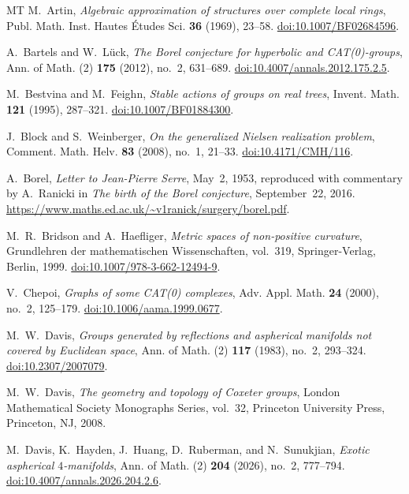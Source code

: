 \begin{thebibliography}{MT}
M.~Artin,
\emph{Algebraic approximation of structures over complete local rings},
Publ. Math. Inst. Hautes \'Etudes Sci. \textbf{36} (1969), 23--58.
\href{https://doi.org/10.1007/BF02684596}{doi:10.1007/BF02684596}.

A.~Bartels and W.~L\"uck,
\emph{The Borel conjecture for hyperbolic and CAT(0)-groups},
Ann. of Math. (2) \textbf{175} (2012), no.~2, 631--689.
\href{https://doi.org/10.4007/annals.2012.175.2.5}{doi:10.4007/annals.2012.175.2.5}.

M.~Bestvina and M.~Feighn,
\emph{Stable actions of groups on real trees},
Invent. Math. \textbf{121} (1995), 287--321.
\href{https://doi.org/10.1007/BF01884300}{doi:10.1007/BF01884300}.

J.~Block and S.~Weinberger,
\emph{On the generalized Nielsen realization problem},
Comment. Math. Helv. \textbf{83} (2008), no.~1, 21--33.
\href{https://doi.org/10.4171/CMH/116}{doi:10.4171/CMH/116}.

A.~Borel,
\emph{Letter to Jean-Pierre Serre}, May~2, 1953,
reproduced with commentary by A.~Ranicki in
\emph{The birth of the Borel conjecture}, September~22, 2016.
\url{https://www.maths.ed.ac.uk/~v1ranick/surgery/borel.pdf}.

M.~R.~Bridson and A.~Haefliger,
\emph{Metric spaces of non-positive curvature},
Grundlehren der mathematischen Wissenschaften, vol.~319,
Springer-Verlag, Berlin, 1999.
\href{https://doi.org/10.1007/978-3-662-12494-9}{doi:10.1007/978-3-662-12494-9}.

V.~Chepoi,
\emph{Graphs of some CAT(0) complexes},
Adv. Appl. Math. \textbf{24} (2000), no.~2, 125--179.
\href{https://doi.org/10.1006/aama.1999.0677}{doi:10.1006/aama.1999.0677}.

M.~W.~Davis,
\emph{Groups generated by reflections and aspherical manifolds not covered by Euclidean space},
Ann. of Math. (2) \textbf{117} (1983), no.~2, 293--324.
\href{https://doi.org/10.2307/2007079}{doi:10.2307/2007079}.

M.~W.~Davis,
\emph{The geometry and topology of Coxeter groups},
London Mathematical Society Monographs Series, vol.~32,
Princeton University Press, Princeton, NJ, 2008.

M.~Davis, K.~Hayden, J.~Huang, D.~Ruberman, and N.~Sunukjian,
\emph{Exotic aspherical $4$-manifolds},
Ann. of Math. (2) \textbf{204} (2026), no.~2, 777--794.
\href{https://doi.org/10.4007/annals.2026.204.2.6}{doi:10.4007/annals.2026.204.2.6}.


\end{thebibliography}

